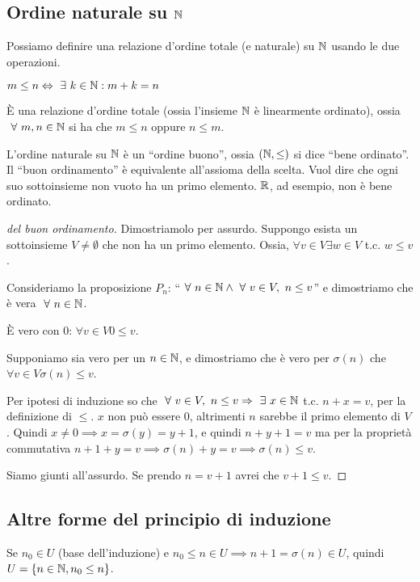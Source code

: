 \subsection{Ordine naturale su $\mathbb{N}$}

Possiamo definire una relazione d'ordine totale (e naturale) su $\mathbb{N}$ usando le due operazioni.
\begin{defn}
$m \le n \iff \exists k \in \naturals : m + k = n$
\end{defn}
\`E una relazione d'ordine totale (ossia l'insieme $\mathbb{N}$ \`e linearmente ordinato), ossia $\forall m, n \in \naturals$ si ha che $ m \le n$ oppure $n \le m$.

L'ordine naturale su $\mathbb{N}$ \`e un ``ordine buono'', ossia $(\mathbb{N}, \le)$ si dice ``bene ordinato''. Il ``buon ordinamento'' \`e equivalente all'assioma della scelta. Vuol dire che ogni suo sottoinsieme non vuoto ha un primo elemento. $\mathbb{R}$, ad esempio, non \`e bene ordinato.
\begin{proof}[del buon ordinamento]
Dimostriamolo per assurdo. Suppongo esista un sottoinsieme $V \neq \emptyset$ che non ha un primo elemento. Ossia, $\forall v \in V \exists w \in V$ t.c. $w \le v$.

Consideriamo la proposizione $P_n$: ``$\forall n \in \naturals \land \forall v \in V, \ n \le v$'' e dimostriamo che \`e vera $\forall n \in \naturals$.

\`E vero con 0: $\forall v \in V 0 \le v$.

Supponiamo sia vero per un $n \in \mathbb{N}$, e dimostriamo che \`e vero per $\sigma(n) $ che $ \forall v \in V \sigma(n) \le v$.

Per ipotesi di induzione so che $\forall v \in V, \ n \le v \implies \exists x \in \naturals$ t.c. $n + x = v$, per la definizione di $\le$. $x$ non pu\`o essere 0, altrimenti $n$ sarebbe il primo elemento di $V$. Quindi $x \neq 0 \implies x = \sigma(y) = y + 1$, e quindi $n + y + 1 = v $ ma per la propriet\`a commutativa $n + 1 + y = v \implies \sigma(n) + y = v \implies \sigma(n) \le v$.

Siamo giunti all'assurdo. Se prendo $n = v + 1$ avrei che $v + 1 \le v$.
\end{proof}

\subsection{Altre forme del principio di induzione}

Se $n_0 \in U$ (base dell'induzione) e $n_0 \le n \in U \implies n+1 = \sigma(n) \in U$, quindi $U = \{ n \in \mathbb{N}, n_0  \le n\}$.

